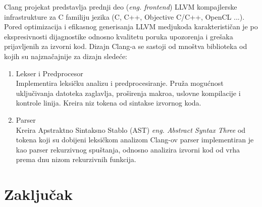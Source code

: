 \documentclass[12pt,oneside]{memoir}
\begin{document}
Clang projekat predstavlja prednji deo (\textit{eng. frontend}) LLVM kompajlerske infrastrukture za C familiju jezika (C, C++, Objective C/C++, OpenCL ...).
Pored optimizacija i efikasnog generisanja LLVM medjukoda karakterističan je po ekspresivnosti dijagnostike odnosno kvalitetu poruka upozorenja i grešaka prijavljenih za izvorni kod. Dizajn Clang-a se sastoji od mnoštva biblioteka od kojih su najznačajnije za dizajn sledeće:

\begin{enumerate}
  \item{Lekser i Predprocesor \\
       Implementira leksičku analizu i predprocesiranje.
       Pruža mogućnost uključivanja datoteka zaglavlja, proširenja makroa, uslovne kompilacije i kontrole linija. 
       Kreira niz tokena od sintakse izvornog koda.}
  \item{Parser \\
        Kreira Apstraktno Sintaksno Stablo (AST) \textit{eng. Abstract Syntax Three} od tokena koji su dobijeni leksičkom analizom}
        Clang-ov parser implementiran je kao parser rekurzivnog spuštanja, odnosno analizira izvorni kod od vrha prema dnu nizom rekurzivnih funkcija.

\end{enumerate}






\chapter{Zaključak}


\literatura

\backmatter
\end{document}
